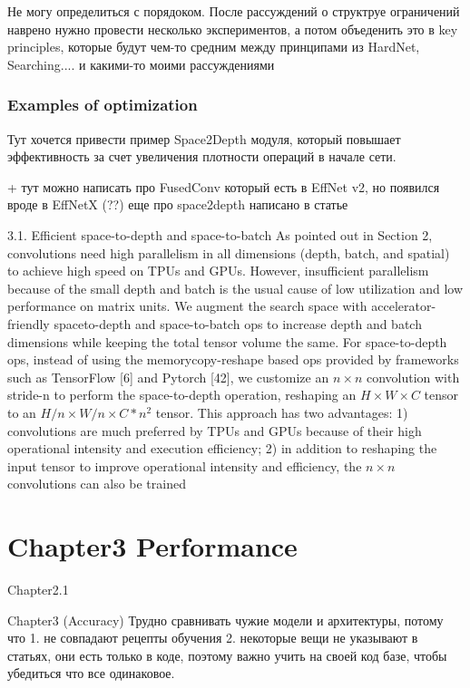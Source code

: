Не могу определиться с порядоком. После рассуждений о структруе ограничений наврено нужно провести несколько экспериментов, а потом объеденить это в key principles, которые будут чем-то средним между принципами из HardNet, Searching.... и какими-то моими рассуждениями



\subsection{Examples of optimization}
Тут хочется привести пример Space2Depth модуля, который повышает эффективность за счет увеличения плотности операций в начале сети. 

 + тут можно написать про FusedConv который есть в EffNet v2, но появился вроде в EffNetX (??) 
еще про space2depth написано в статье \cite{ridnik2021_tresnet}


3.1. Efficient space-to-depth and space-to-batch
As pointed out in Section 2, convolutions need high parallelism in all dimensions (depth, batch, and spatial) to achieve high speed on TPUs and GPUs. However, insufficient parallelism because of the small depth and batch is the usual cause of low utilization and low performance on matrix units. We augment the search space with accelerator-friendly spaceto-depth and space-to-batch ops to increase depth and batch dimensions while keeping the total tensor volume the same. For space-to-depth ops, instead of using the memorycopy-reshape based ops provided by frameworks such as TensorFlow [6] and Pytorch [42], we customize an $n \times n$ convolution with stride-n to perform the space-to-depth operation, reshaping an $H \times W \times C$ tensor to an $H / n \times W / n \times C * n^{2}$ tensor. This approach has two advantages: 1) convolutions are much preferred by TPUs and GPUs because of their high operational intensity and execution efficiency; 2) in addition to reshaping the input tensor to improve operational intensity and efficiency, the $n \times n$ convolutions can also be trained


\chapter{Chapter3 Performance}

Chapter2.1


Chapter3 (Accuracy)
Трудно сравнивать чужие модели и архитектуры, потому что 1. не совпадают рецепты обучения 2. некоторые вещи не указывают в статьях, они есть только в коде, поэтому важно учить на своей код базе, чтобы убедиться что все одинаковое. 

